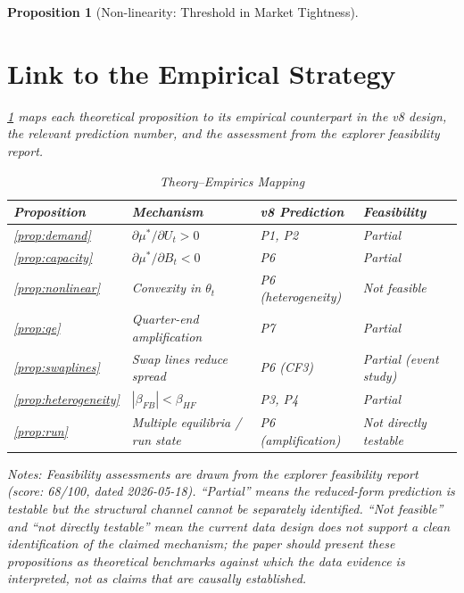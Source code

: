 \documentclass[12pt]{article}
\newtheorem{proposition}{Proposition}
\theoremstyle{definition}
\newcommand{\1}[1]{\mathds{1}\left[#1\right]}
\begin{document}
\begin{proposition}[Non-linearity: Threshold in Market Tightness]
\section{Link to the Empirical Strategy}
\label{sec:empirical-link}

\cref{tab:theory-empirics} maps each theoretical proposition to its empirical
counterpart in the v8 design, the relevant prediction number, and the
assessment from the explorer feasibility report.

\begin{table}[htbp]
\centering
\begin{threeparttable}
\caption{Theory--Empirics Mapping}
\label{tab:theory-empirics}
\begin{tabular}{llll}
\toprule
Proposition & Mechanism & v8 Prediction & Feasibility \\
\midrule
\cref{prop:demand} & $\partial\mu^*/\partial U_t > 0$ & P1, P2 & Partial \\
\cref{prop:capacity} & $\partial\mu^*/\partial B_t < 0$ & P6 & Partial \\
\cref{prop:nonlinear} & Convexity in $\theta_t$ & P6 (heterogeneity) & Not feasible \\
\cref{prop:qe} & Quarter-end amplification & P7 & Partial \\
\cref{prop:swaplines} & Swap lines reduce spread & P6 (CF3) & Partial (event study) \\
\cref{prop:heterogeneity} & $|\beta_{FB}| < \beta_{HF}$ & P3, P4 & Partial \\
\cref{prop:run} & Multiple equilibria / run state & P6 (amplification) & Not directly testable \\
\bottomrule
\end{tabular}
\begin{tablenotes}\small
\item \textit{Notes:} Feasibility assessments are drawn from the explorer
feasibility report (score: 68/100, dated 2026-05-18). ``Partial'' means the
reduced-form prediction is testable but the structural channel cannot be
separately identified. ``Not feasible'' and ``not directly testable'' mean
the current data design does not support a clean identification of the
claimed mechanism; the paper should present these propositions as theoretical
benchmarks against which the data evidence is interpreted, not as claims that
are causally established.
\end{tablenotes}
\end{threeparttable}
\end{table}


\end{proposition}
\end{document}
